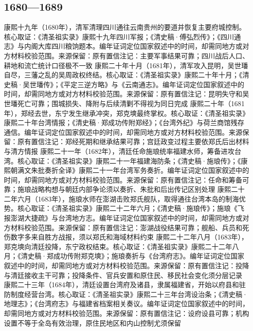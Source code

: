 \subsection{1680—1689}
康熙十九年（1680年），清军清理四川通往云南贵州的要道并恢复主要府城控制。核心取证：《清圣祖实录》康熙十九年四川军报；《清史稿·傅弘烈传》；《四川通志》与内阁大库四川粮饷题本。编年证词定位国家叙述中的时间，却需同地方或对方材料校验范围。来源保留：原有置信注记：主要军事结果可靠；四川战后人口、耕地和流亡统计口径极不一致
康熙二十年十月（1681年），清军攻入昆明，吴世璠自尽，三藩之乱的吴周政权终结。核心取证：《清圣祖实录》康熙二十年十月；《清史稿·吴世璠传》；《平定三逆方略》与《云南通志》。编年证词定位国家叙述中的时间，却需同地方或对方材料校验范围。来源保留：原有置信注记：昆明失守和吴世璠死亡可靠；围城损失、降附与后续清剿不得视为同日完成
康熙二十年（1681年），郑经去世，东宁发生继承冲突，郑克塽最终掌权。核心取证：《清圣祖实录》康熙二十年台湾情报；《清史稿·郑成功传附郑经》；《台湾外纪》与荷兰商馆残存通信。编年证词定位国家叙述中的时间，却需同地方或对方材料校验范围。来源保留：原有置信注记：郑经死期和继承结果可靠；宫廷政变过程主要依郑氏后出材料与清方情报
康熙二十一年（1682年），清廷任命施琅统率福建水师，筹备进攻台湾。核心取证：《清圣祖实录》康熙二十一年福建海防条；《清史稿·施琅传》；《康熙朝满文朱批奏折全译》康熙二十一年台湾军务奏折。编年证词定位国家叙述中的时间，却需同地方或对方材料校验范围。来源保留：原有置信注记：任命和筹备可靠；施琅战略构想与朝廷内部争论须以奏折、朱批和后出传记区别处理
康熙二十二年六月（1683年），施琅水师在澎湖击败郑氏舰队，取得通往台湾本岛的制海优势。核心取证：《清圣祖实录》康熙二十二年六月；《清史稿·施琅传》；施琅《飞报澎湖大捷疏》与台湾地方志。编年证词定位国家叙述中的时间，却需同地方或对方材料校验范围。来源保留：原有置信注记：澎湖战役结果可靠；舰船、兵员和死伤数字多来自胜方战报，须以郑氏和海域材料约束
康熙二十二年八月（1683年），郑克塽向清廷投降，东宁政权结束。核心取证：《清圣祖实录》康熙二十二年八月；《清史稿·郑成功传附郑克塽》；施琅奏折与《台湾府志》。编年证词定位国家叙述中的时间，却需同地方或对方材料校验范围。来源保留：原有置信注记：投降与清廷接收主干可靠；投降条件、官兵安置和原住民、移民社会变化须分层记录
康熙二十三年（1684年），清廷设置台湾府及诸县，隶属福建省，开始以府县和驻防制度经营台湾。核心取证：《清圣祖实录》康熙二十三年台湾设治条；《清史稿·地理志》；《台湾府志》与福建省档案相关奏议。编年证词定位国家叙述中的时间，却需同地方或对方材料校验范围。来源保留：原有置信注记：设府设县可靠；机构设置不等于全岛有效治理，原住民地区和内山控制尤须保留
